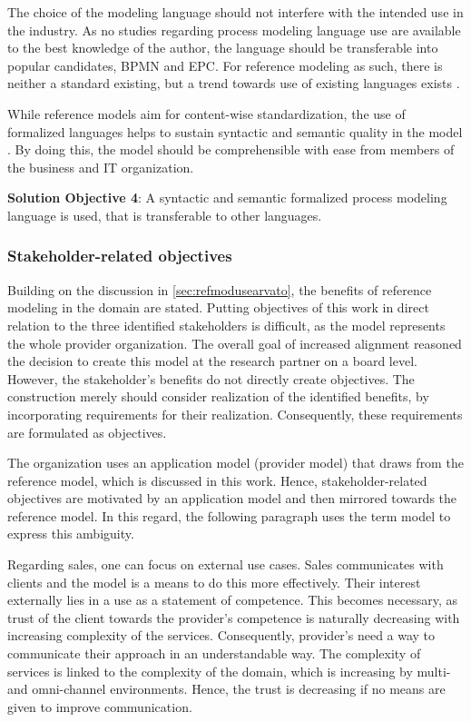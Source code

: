 The choice of the modeling language should not interfere with the intended use in the industry. As no studies regarding process modeling language use are available to the best knowledge of the author, the language should be transferable into popular candidates, \eg \acrshort{BPMN} and \acrshort{EPC}. For reference modeling as such, there is neither a standard existing, but a trend towards use of existing languages exists \citep{Fettke2004}. 

While reference models aim for content-wise standardization, the use of formalized languages helps to sustain syntactic and semantic quality in the model \citep{Fettke2004}. By doing this, the model should be comprehensible with ease from members of the business and IT organization. 

\hfill\begin{minipage}{\dimexpr\textwidth-1.2cm}
	\textbf{Solution Objective 4}: A syntactic and semantic formalized process modeling language is used, that is transferable to other languages. 
	
\end{minipage}

\subsubsection{Stakeholder-related objectives}

Building on the discussion in \ref{sec:refmodusearvato}, the benefits of reference modeling in the domain are stated. Putting objectives of this work in direct relation to the three identified stakeholders is difficult, as the model represents the whole provider organization. The overall goal of increased alignment reasoned the decision to create this model at the research partner on a board level. However, the stakeholder's benefits do not directly create objectives. The construction merely should consider realization of the identified benefits, by incorporating requirements for their realization.  Consequently, these requirements are formulated as objectives.  

The organization uses an application model (provider model) that draws from the reference model, which is discussed in this work. Hence, stakeholder-related objectives are motivated by an application model and then mirrored towards the reference model. In this regard, the following paragraph uses the term model to express this ambiguity. 

Regarding sales, one can focus on external use cases. Sales communicates with clients and the model is a means to do this more effectively. Their interest externally lies in a use as a statement of competence. This becomes necessary, as trust of the client towards the provider's competence is naturally decreasing with increasing complexity of the services. Consequently, provider's need a way to communicate their approach in an understandable way. The complexity of services is linked to the complexity of the domain, which is increasing by multi- and omni-channel environments. Hence, the trust is decreasing if no means are given to improve communication. 



